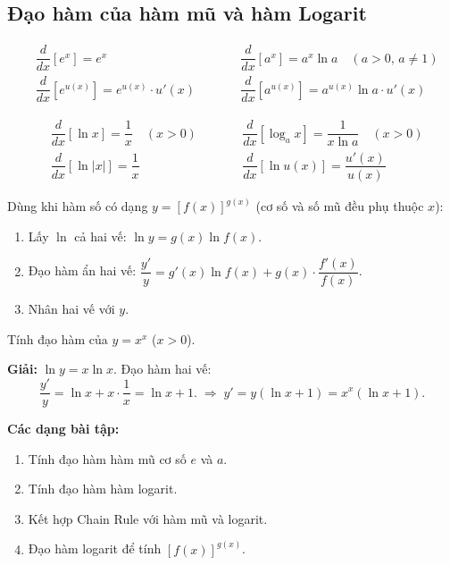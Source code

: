 \documentclass[12pt,a4paper]{article}
\begin{document}
\subsection{Đạo hàm của hàm mũ và hàm Logarit}

\begin{congthuc}[title={Đạo hàm hàm mũ}]
  \begin{align*}
    &\dfrac{d}{dx}[e^x] = e^x
    &\qquad&
    \dfrac{d}{dx}[a^x] = a^x \ln a \quad (a > 0,\, a \ne 1) \\[6pt]
    &\dfrac{d}{dx}[e^{u(x)}] = e^{u(x)} \cdot u'(x)
    &&
    \dfrac{d}{dx}[a^{u(x)}] = a^{u(x)} \ln a \cdot u'(x)
  \end{align*}
\end{congthuc}

\begin{congthuc}[title={Đạo hàm hàm Logarit}]
  \begin{align*}
    &\dfrac{d}{dx}[\ln x] = \dfrac{1}{x} \quad (x > 0)
    &\qquad&
    \dfrac{d}{dx}[\log_a x] = \dfrac{1}{x \ln a} \quad (x > 0) \\[6pt]
    &\dfrac{d}{dx}[\ln|x|] = \dfrac{1}{x}
    &&
    \dfrac{d}{dx}[\ln u(x)] = \dfrac{u'(x)}{u(x)}
  \end{align*}
\end{congthuc}

\begin{phuongphap}[title={Logarithmic Differentiation (Đạo hàm Logarit)}]
  Dùng khi hàm số có dạng $y = [f(x)]^{g(x)}$ (cơ số và số mũ đều phụ thuộc $x$):
  \begin{enumerate}
    \item Lấy $\ln$ cả hai vế: $\ln y = g(x) \ln f(x)$.
    \item Đạo hàm ẩn hai vế: $\dfrac{y'}{y} = g'(x) \ln f(x) + g(x) \cdot \dfrac{f'(x)}{f(x)}$.
    \item Nhân hai vế với $y$.
  \end{enumerate}
\end{phuongphap}

\begin{vidu}
  Tính đạo hàm của $y = x^x$ ($x > 0$).

  \medskip\textbf{Giải:}
  $\ln y = x \ln x$. Đạo hàm hai vế:
  \[
    \dfrac{y'}{y} = \ln x + x \cdot \dfrac{1}{x} = \ln x + 1.
    \;\Rightarrow\;
    y' = y(\ln x + 1) = x^x(\ln x + 1).
  \]
\end{vidu}

\medskip\noindent\textbf{Các dạng bài tập:}
\begin{enumerate}[label=\textbf{Dạng \arabic*:}, leftmargin=*, align=left]
  \item Tính đạo hàm hàm mũ cơ số $e$ và $a$.
  \item Tính đạo hàm hàm logarit.
  \item Kết hợp Chain Rule với hàm mũ và logarit.
  \item Đạo hàm logarit để tính $[f(x)]^{g(x)}$.
\end{enumerate}
\end{document}
